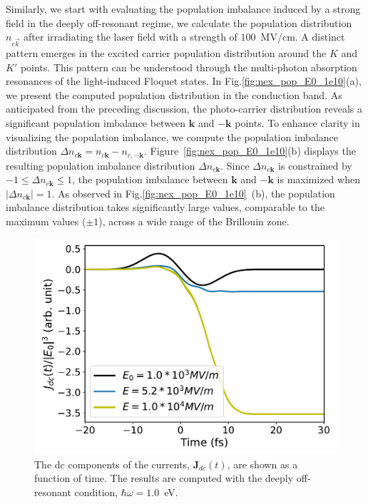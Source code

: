 Similarly, we start with evaluating the population imbalance induced by a strong field in the
deeply off-resonant regime, we calculate the population distribution $n_{c\vec{k}}$ after
irradiating the laser field with a strength of $100$~MV/cm. A distinct pattern emerges in the excited carrier population distribution around the $K$ and $K'$ points. This pattern can be understood through the multi-photon absorption resonances of the light-induced Floquet states\cite{galler2023mapping}. In Fig.\ref{fig:nex_pop_E0_1e10}(a), we present the computed population distribution in the conduction band. As anticipated from the preceding discussion, the photo-carrier distribution reveals a significant population imbalance between $\mathbf{k}$ and $-\mathbf{k}$ points. To enhance clarity in visualizing the population imbalance, we compute the population imbalance distribution $\Delta n_{c\mathbf{k}}=n_{c\mathbf{k}}-n_{c, -\mathbf{k}}$. Figure~\ref{fig:nex_pop_E0_1e10}(b) displays the resulting population imbalance distribution $\Delta n_{c\mathbf{k}}$. Since $\Delta n_{c\mathbf{k}}$ is constrained by $-1\le \Delta n_{c\mathbf{k}} \le 1$, the population imbalance between $\mathbf{k}$ and $-\mathbf{k}$ is maximized when $|\Delta n_{c\mathbf{k}}|=1$. As observed in Fig.\ref{fig:nex_pop_E0_1e10}~(b), the population imbalance distribution takes significantly large values, comparable to the maximum values ($\pm 1$), across a wide range of the Brillouin zone.
\begin{figure}[htbp]
\centering
\includegraphics[width=0.8\linewidth]{pic/current_off_resonant.pdf}
\caption{\label{fig:current_off_resonant} 
The dc components of the currents, $\mathbf J_{dc}(t)$, are shown as a function of time. The results are computed with the deeply off-resonant condition, $\hbar\omega = 1.0$~eV.}
\end{figure}

